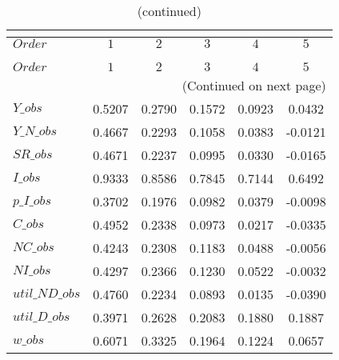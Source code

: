  
\begin{center}
\begin{longtable}{lccccc} 
\caption{COEFFICIENTS OF AUTOCORRELATION}\\
 \label{Table:th_autocorr_matrix}\\
\toprule 
$Order          $	 & 	 $         1$	 & 	 $         2$	 & 	 $         3$	 & 	 $         4$	 & 	 $         5$\\
\midrule \endfirsthead 
\caption{(continued)}\\
 \toprule \\ 
$Order          $	 & 	 $         1$	 & 	 $         2$	 & 	 $         3$	 & 	 $         4$	 & 	 $         5$\\
\midrule \endhead 
\midrule \multicolumn{6}{r}{(Continued on next page)} \\ \bottomrule \endfoot 
\bottomrule \endlastfoot 
$Y\_obs         $	 & 	    0.5207	 & 	    0.2790	 & 	    0.1572	 & 	    0.0923	 & 	    0.0432 \\ 
$Y\_N\_obs      $	 & 	    0.4667	 & 	    0.2293	 & 	    0.1058	 & 	    0.0383	 & 	   -0.0121 \\ 
$SR\_obs        $	 & 	    0.4671	 & 	    0.2237	 & 	    0.0995	 & 	    0.0330	 & 	   -0.0165 \\ 
$I\_obs         $	 & 	    0.9333	 & 	    0.8586	 & 	    0.7845	 & 	    0.7144	 & 	    0.6492 \\ 
$p\_I\_obs      $	 & 	    0.3702	 & 	    0.1976	 & 	    0.0982	 & 	    0.0379	 & 	   -0.0098 \\ 
$C\_obs         $	 & 	    0.4952	 & 	    0.2338	 & 	    0.0973	 & 	    0.0217	 & 	   -0.0335 \\ 
$NC\_obs        $	 & 	    0.4243	 & 	    0.2308	 & 	    0.1183	 & 	    0.0488	 & 	   -0.0056 \\ 
$NI\_obs        $	 & 	    0.4297	 & 	    0.2366	 & 	    0.1230	 & 	    0.0522	 & 	   -0.0032 \\ 
$util\_ND\_obs  $	 & 	    0.4760	 & 	    0.2234	 & 	    0.0893	 & 	    0.0135	 & 	   -0.0390 \\ 
$util\_D\_obs   $	 & 	    0.3971	 & 	    0.2628	 & 	    0.2083	 & 	    0.1880	 & 	    0.1887 \\ 
$w\_obs         $	 & 	    0.6071	 & 	    0.3325	 & 	    0.1964	 & 	    0.1224	 & 	    0.0657 \\ 
\end{longtable}
 \end{center}
